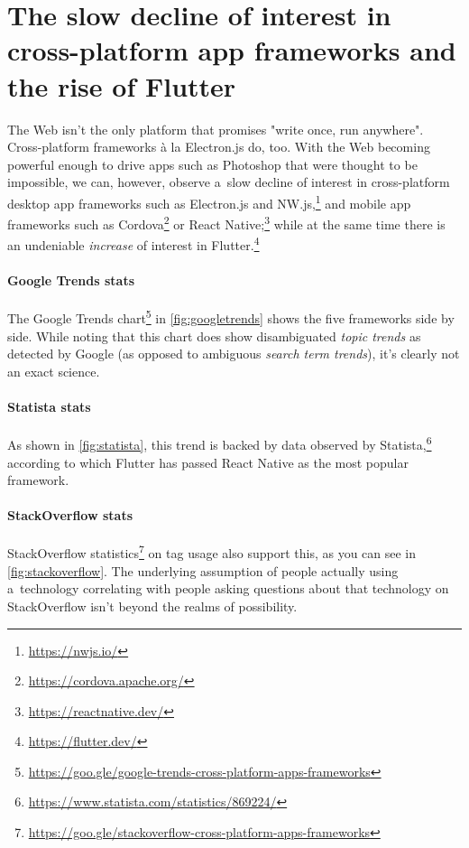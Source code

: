 \documentclass[sigconf]{acmart}
\begin{document}
\section{The slow decline of interest in cross-platform app frameworks and the rise of Flutter}

The Web isn't the only platform that promises "write once, run anywhere". Cross-platform frameworks à la Electron.js do, too. With the Web becoming powerful enough to drive apps such as Photoshop that were thought to be impossible, we can, however, observe a~slow decline of interest in cross-platform desktop app frameworks such as Electron.js and NW.js,\footnote{\url{https://nwjs.io/}} and mobile app frameworks such as Cordova\footnote{\url{https://cordova.apache.org/}} or React Native;\footnote{\url{https://reactnative.dev/}} while at the same time there is an undeniable \textit{increase} of interest in Flutter.\footnote{\url{https://flutter.dev/}}

\paragraph{Google Trends stats}

The Google Trends chart\footnote{\url{https://goo.gle/google-trends-cross-platform-apps-frameworks}} in \autoref{fig:googletrends} shows the five frameworks side by side. While noting that this chart does show disambiguated \textit{topic trends} as detected by Google (as opposed to ambiguous \textit{search term trends}), it's clearly not an exact science.

\paragraph{Statista stats}

As shown in \autoref{fig:statista}, this trend is backed by data observed by Statista,\footnote{\url{https://www.statista.com/statistics/869224/}} according to which Flutter has passed React Native as the most popular framework.

\paragraph{StackOverflow stats}

StackOverflow statistics\footnote{\url{https://goo.gle/stackoverflow-cross-platform-apps-frameworks}} on tag usage also support this, as you can see in \autoref{fig:stackoverflow}. The underlying assumption of people actually using a~technology correlating with people asking questions about that technology on StackOverflow isn't beyond the realms of possibility.
\end{document}
